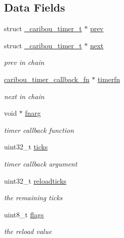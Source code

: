 \subsection*{Data Fields}
\begin{DoxyCompactItemize}
\item 
struct \hyperlink{struct__caribou__timer__t}{\-\_\-caribou\-\_\-timer\-\_\-t} $\ast$ \hyperlink{struct__caribou__timer__t_a711f3f84b0ef799261b12d7c0a6d4132}{prev}
\item 
struct \hyperlink{struct__caribou__timer__t}{\-\_\-caribou\-\_\-timer\-\_\-t} $\ast$ \hyperlink{struct__caribou__timer__t_a922fab9a09a701c3ac7273c9548a4afa}{next}
\begin{DoxyCompactList}\small\item\em prev in chain \end{DoxyCompactList}\item 
\hyperlink{timer_8h_af991f5bbba685d64fd4a78090140228b}{caribou\-\_\-timer\-\_\-callback\-\_\-fn} $\ast$ \hyperlink{struct__caribou__timer__t_a036d01df45a585775dd0ef585f90eb7a}{timerfn}
\begin{DoxyCompactList}\small\item\em next in chain \end{DoxyCompactList}\item 
void $\ast$ \hyperlink{struct__caribou__timer__t_a9276b37ed4a76264b1f8570b678abe42}{fnarg}
\begin{DoxyCompactList}\small\item\em timer callback function \end{DoxyCompactList}\item 
uint32\-\_\-t \hyperlink{struct__caribou__timer__t_a94c03a7c23a27aa378b861389b6ee0c8}{ticks}
\begin{DoxyCompactList}\small\item\em timer callback argument \end{DoxyCompactList}\item 
uint32\-\_\-t \hyperlink{struct__caribou__timer__t_a1b66f8c7abf7e00efa3d0adc916b0ecd}{reloadticks}
\begin{DoxyCompactList}\small\item\em the remaining ticks \end{DoxyCompactList}\item 
uint8\-\_\-t \hyperlink{struct__caribou__timer__t_a492a012c1141298c40a781c09ca86aed}{flags}
\begin{DoxyCompactList}\small\item\em the reload value \end{DoxyCompactList}\end{DoxyCompactItemize}


